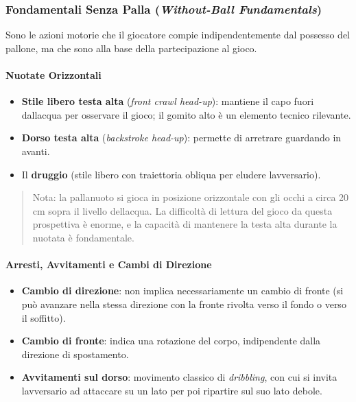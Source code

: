 \documentclass[a4paper,11pt]{article}
\providecommand{\tightlist}{%
  \setlength{\itemsep}{0pt}\setlength{\parskip}{0pt}}
\begin{document}
\subsubsection{\texorpdfstring{Fondamentali Senza Palla
            (\emph{Without-Ball
                  Fundamentals})}{Fondamentali Senza Palla (Without-Ball Fundamentals)}}\label{fondamentali-senza-palla-without-ball-fundamentals}

Sono le azioni motorie che il giocatore compie indipendentemente dal
possesso del pallone, ma che sono alla base della partecipazione al
gioco.

\paragraph{Nuotate Orizzontali}\label{nuotate-orizzontali}

\begin{itemize}
      \tightlist
      \item
            \textbf{Stile libero testa alta} (\emph{front crawl head-up}):
            mantiene il capo fuori dall\textquotesingle acqua per osservare il
            gioco; il gomito alto è un elemento tecnico rilevante.
      \item
            \textbf{Dorso testa alta} (\emph{backstroke head-up}): permette di
            arretrare guardando in avanti.
      \item
            Il \textbf{druggio} (stile libero con traiettoria obliqua per eludere
            l\textquotesingle avversario).
\end{itemize}

\begin{quote}
      Nota: la pallanuoto si gioca in posizione orizzontale con gli occhi a
      circa 20 cm sopra il livello dell\textquotesingle acqua. La difficoltà
      di lettura del gioco da questa prospettiva è enorme, e la capacità di
      mantenere la testa alta durante la nuotata è fondamentale.
\end{quote}

\paragraph{Arresti, Avvitamenti e Cambi di
      Direzione}\label{arresti-avvitamenti-e-cambi-di-direzione}

\begin{itemize}
      \tightlist
      \item
            \textbf{Cambio di direzione}: non implica necessariamente un cambio di
            fronte (si può avanzare nella stessa direzione con la fronte rivolta
            verso il fondo o verso il soffitto).
      \item
            \textbf{Cambio di fronte}: indica una rotazione del corpo,
            indipendente dalla direzione di spostamento.
      \item
            \textbf{Avvitamenti sul dorso}: movimento classico di
            \emph{dribbling}, con cui si invita l\textquotesingle avversario ad
            attaccare su un lato per poi ripartire sul suo lato debole.
\end{itemize}
\end{document}
